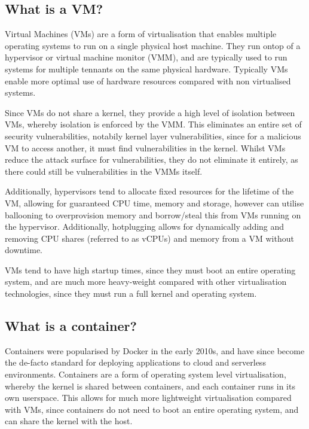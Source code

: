 \subsection{What is a VM?}
Virtual Machines (VMs) are a form of virtualisation that enables multiple operating systems to run on a single physical host machine\cite{ramosjoaocarloscarvalhodossantosSecurityChallengesVirtualization2009}. They run ontop of a hypervisor or virtual machine monitor (VMM), and are typically used to run systems for multiple tennants on the same physical hardware. Typically VMs enable more optimal use of hardware resources \cite{desaiHypervisorSurveyConcepts2013} compared with non virtualised systems.

Since VMs do not share a kernel, they provide a high level of isolation between VMs\cite{hoeferTaxonomyCloudComputing2010}, whereby isolation is enforced by the VMM. This eliminates an entire set of security vulnerabilities, notabily kernel layer vulnerabilities, since for a malicious VM to access another, it must find vulnerabilities in the kernel. Whilst VMs reduce the attack surface for vulnerabilities, they do not eliminate it entirely, as there could still be vulnerabilities in the VMMs itself\cite{reubenSurveyVirtualMachine,ramosjoaocarloscarvalhodossantosSecurityChallengesVirtualization2009}.

Additionally, hypervisors tend to allocate fixed resources for the lifetime of the VM, allowing for guaranteed CPU time, memory and storage\cite{hoeferTaxonomyCloudComputing2010}, however can utilise ballooning to overprovision memory and borrow/steal this from VMs running on the hypervisor\cite{moniruzzamanAnalysisMemoryBallooning2014}. Additionally, hotplugging\cite{hildenbrandVirtiomemParavirtualizedMemory2021,LKMLDanielKiper} allows for dynamically adding and removing CPU shares (referred to as vCPUs) and memory from a VM without downtime.

VMs tend to have high startup times\cite{haoEmpiricalAnalysisVM2021}, since they must boot an entire operating system, and are much more heavy-weight compared with other virtualisation technologies, since they must run a full kernel and operating system.

\subsection{What is a container?}
Containers were popularised by Docker\cite{DockerAcceleratedContainer2022} in the early 2010s, and have since become the de-facto standard\cite{vanoCloudNativeWorkloadOrchestration2023} for deploying applications to cloud and serverless environments. Containers are a form of operating system level virtualisation\cite{yadavDockerContainersVirtual2019}, whereby the kernel is shared between containers\cite{WhatContainerDockera}, and each container runs in its own userspace. This allows for much more lightweight virtualisation compared with VMs, since containers do not need to boot an entire operating system, and can share the kernel with the host\cite{potdarPerformanceEvaluationDocker2020}.

